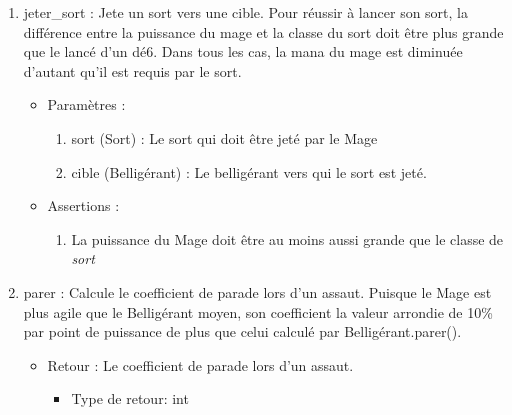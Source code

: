 \documentclass[12pt,pdftex,oneside]{article}
\begin{document}
\begin{itemize}
    \begin{enumerate}
    \item jeter\_sort : Jete un sort vers une cible. Pour réussir à lancer son sort, la
      différence entre la puissance du mage et la classe du sort doit être plus
      grande que le lancé d'un dé6. Dans tous les cas, la mana du mage est diminuée d'autant qu'il est requis par le sort.
      \begin{itemize}
      \item Paramètres : 
        \begin{enumerate}
        \item sort (Sort) : Le sort qui doit être jeté par le Mage
        \item cible (Belligérant) : Le belligérant vers qui le sort est jeté.
        \end{enumerate}
      \item Assertions : 
        \begin{enumerate}
        \item La puissance du Mage doit être au moins aussi grande que le classe
          de \emph{sort}
        \end{enumerate}
      \end{itemize}

    \item parer : Calcule le coefficient de parade lors d'un assaut. Puisque le
      Mage est plus agile que le Belligérant moyen, son coefficient la valeur arrondie de 10\% par
      point de puissance de plus que celui calculé par Belligérant.parer().
      \begin{itemize}
      \item Retour : Le coefficient de parade lors d'un assaut.
          \begin{itemize}
          \item Type de retour: int
          \end{itemize}
      \end{itemize}
    \end{enumerate}


\end{itemize}
\end{document}
